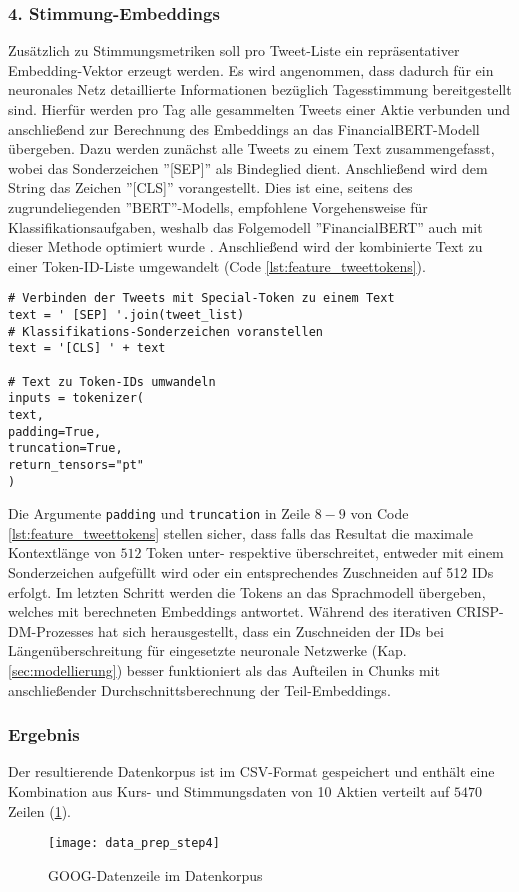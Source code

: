 \subsubsection*{4. Stimmung-Embeddings}
Zusätzlich zu Stimmungsmetriken soll pro Tweet-Liste ein repräsentativer Embedding-Vektor erzeugt werden. Es wird angenommen, dass dadurch für ein neuronales Netz detaillierte Informationen bezüglich Tagesstimmung bereitgestellt sind. Hierfür werden pro Tag alle gesammelten Tweets einer Aktie verbunden und anschließend zur Berechnung des Embeddings an das FinancialBERT-Modell übergeben.
Dazu werden zunächst alle Tweets zu einem Text zusammengefasst, wobei das Sonderzeichen ''[SEP]'' als Bindeglied dient. Anschließend wird dem String das Zeichen ''[CLS]'' vorangestellt. Dies ist eine, seitens des zugrundeliegenden ''BERT''-Modells, empfohlene Vorgehensweise für Klassifikationsaufgaben, weshalb das Folgemodell ''FinancialBERT'' auch mit dieser Methode optimiert wurde \autocite[Kap. 5.3]{hazourli2022financialbert}.
Anschließend wird der kombinierte Text zu einer Token-ID-Liste umgewandelt (Code \ref{lst:feature_tweettokens}). 
\begin{lstlisting}[caption={Umwandlung von Tweets zu Token-IDs}, label=lst:feature_tweettokens, captionpos=t]
# Verbinden der Tweets mit Special-Token zu einem Text
text = ' [SEP] '.join(tweet_list)
# Klassifikations-Sonderzeichen voranstellen
text = '[CLS] ' + text

# Text zu Token-IDs umwandeln
inputs = tokenizer(
text, 
padding=True, 
truncation=True, 
return_tensors="pt"
)
\end{lstlisting}

Die Argumente \texttt{padding} und \texttt{truncation} in Zeile $8-9$ von Code \ref{lst:feature_tweettokens} stellen sicher, dass falls das Resultat die maximale Kontextlänge von $512$ Token unter- respektive überschreitet, entweder mit einem Sonderzeichen aufgefüllt wird oder ein entsprechendes Zuschneiden auf 512 IDs erfolgt.
Im letzten Schritt werden die Tokens an das Sprachmodell übergeben, welches mit berechneten Embeddings antwortet.
Während des iterativen \ac{CRISP-DM}-Prozesses hat sich herausgestellt, dass ein Zuschneiden der IDs bei Längenüberschreitung für eingesetzte neuronale Netzwerke (Kap. \ref{sec:modellierung}) besser funktioniert als das Aufteilen in Chunks mit anschließender Durchschnittsberechnung der Teil-Embeddings.

\subsubsection*{Ergebnis}
Der resultierende Datenkorpus ist im \ac{CSV}-Format gespeichert und enthält eine Kombination aus Kurs- und Stimmungsdaten von 10 Aktien verteilt auf $5470$ Zeilen (\ref{fig:data_prep_step4}).
\begin{figure}[H]
	\texttt{[image: data\_prep\_step4]}
	\caption{GOOG-Datenzeile im Datenkorpus}
	\label{fig:data_prep_step4}
\end{figure}




